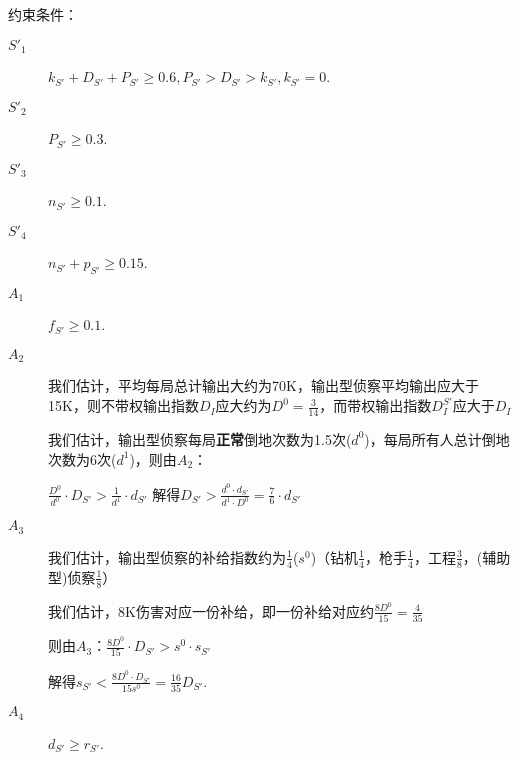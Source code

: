 \documentclass{ctexart}
\begin{document}
约束条件：

\begin{description}
    \item[$S'_1$] $k_{S'} + D_{S'} + P_{S'} \ge 0.6, P_{S'} > D_{S'} > k_{S'}, k_{S'}=0$.
    \item[$S'_2$] $P_{S'} \ge 0.3$.
    \item[$S'_3$] $n_{S'} \ge 0.1$.
    \item[$S'_4$] $n_{S'} + p_{S'} \ge 0.15$.
    \item[$A_1$] $f_{S'} \ge 0.1$.
    \item[$A_2$] 我们估计，平均每局总计输出大约为70K，输出型侦察平均输出应大于15K，则不带权输出指数$D_I$应大约为$D^0 = \frac{3}{14}$，而带权输出指数$D^{S'}_I$应大于$D_I$

          我们估计，输出型侦察每局\textbf{正常}倒地次数为1.5次($d^0$)，每局所有人总计倒地次数为6次($d^1$)，则由$A_2$：

          $\frac{D^0}{d^0} \cdot D_{S'}> \frac{1}{d^1} \cdot d_{S'}$
          解得$D_{S'} > \frac{d^0 \cdot d_{S'}}{d^1 \cdot D^0} = \frac{7}{6} \cdot d_{S'}$
    \item[$A_3$]我们估计，输出型侦察的补给指数约为$\frac{1}{4}$($s^0$)（钻机$\frac{1}{4}$，枪手$\frac{1}{4}$，工程$\frac{3}{8}$，(辅助型)侦察$\frac{1}{8}$）

          我们估计，8K伤害对应一份补给，即一份补给对应约$\frac{8D^0}{15} = \frac{4}{35}$

          则由$A_3$：$\frac{8D^0}{15} \cdot D_{S'} > s^0 \cdot s_{S'}$

          解得$s_{S'} < \frac{8D^0 \cdot D_{S'}}{15 s^0} = \frac{16}{35} D_{S'}$.

    \item[$A_4$] $d_{S'} \ge r_{S'}$.
\end{description}
\end{document}
